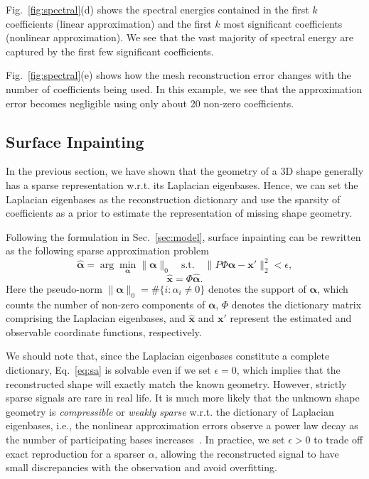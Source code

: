 Fig.~\ref{fig:spectral}(d) shows the spectral energies contained in
the first $k$ coefficients (linear approximation) and the first $k$
most significant coefficients (nonlinear approximation). We see that
the vast majority of spectral energy are captured by the first few
significant coefficients.

Fig.~\ref{fig:spectral}(e) shows how the mesh reconstruction error
changes with the number of coefficients being used. In this example,
we see that the approximation error becomes negligible using only
about 20 non-zero coefficients.


\subsection{Surface Inpainting}

In the previous section, we have shown that the geometry of a 3D shape
generally has a sparse representation w.r.t. its Laplacian
eigenbases. Hence, we can set the Laplacian eigenbases as the
reconstruction dictionary and use the sparsity of coefficients as a
prior to estimate the representation of missing shape geometry.

Following the formulation in Sec.~\ref{sec:model}, surface inpainting
can be rewritten as the following sparse approximation problem
\begin{equation}
\label{eq:sa}
\hat{\mathbf{\alpha}} = \arg\min_{\mathbf{\alpha}} \|\mathbf{\alpha}\|_0 \quad \text{s.t.} \quad \|P\Phi\mathbf{\alpha} - \mathbf{x}'\|_2^2 < \epsilon,
\end{equation}
\begin{equation}
\hat{\mathbf{x}} = \Phi \hat{\mathbf{\alpha}}.
\end{equation}
Here the pseudo-norm $\|\mathbf{\alpha}\|_0 = \#\{ i : \alpha_i \neq
0\}$ denotes the support of $\mathbf{\alpha}$, which counts the number
of non-zero components of $\mathbf{\alpha}$, $\Phi$ denotes the
dictionary matrix comprising the Laplacian eigenbases, and
$\hat{\mathbf{x}}$ and $\mathbf{x}'$ represent the estimated and
observable coordinate functions, respectively.

We should note that, since the Laplacian eigenbases constitute a
complete dictionary, Eq.~\ref{eq:sa} is solvable even if we set
$\epsilon=0$, which implies that the reconstructed shape will exactly
match the known geometry. However, strictly sparse signals are rare in real life.
It is much more likely that the unknown shape geometry is
\emph{compressible} or \emph{weakly sparse} w.r.t. the dictionary of
Laplacian eigenbases, i.e., the nonlinear approximation
errors observe a power law decay as the number of participating bases
increases~\cite{Starck2010}. In practice, we set $\epsilon > 0$ to
trade off exact reproduction for a sparser $\alpha$, allowing the
reconstructed signal to have small discrepancies with the observation
and avoid overfitting.

